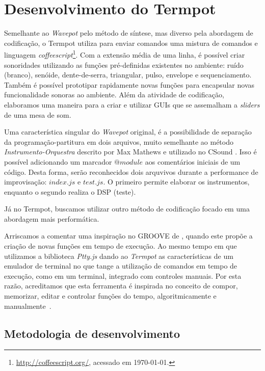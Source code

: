 \section{Desenvolvimento do Termpot}\label{sec:termpot}

Semelhante ao \emph{Wavepot} pelo método de síntese, mas diverso pela abordagem de codificação, o Termpot utiliza para enviar comandos uma mistura de comandos e linguagem \emph{coffeescript}\cite{burnham2011coffeescript}\footnote{\url{http://coffeescript.org/}, acessado em \today.}.
Com a extensão média de uma linha, é possível criar sonoridades utilizando as funções pré-definidas existentes no ambiente: ruído (branco), senóide, dente-de-serra, triangular, pulso, envelope e sequenciamento.
Também é possível prototipar rapidamente novas funções para encapsular novas funcionalidade sonoras ao ambiente.
Além da atividade de codificação, elaboramos uma maneira para a criar e utilizar GUIs que se assemalham a \emph{sliders} de uma mesa de som. 


Uma característica singular do \emph{Wavepot} original, é a possibilidade de separação da programação-partitura em dois arquivos, muito semelhante ao método \emph{Instrumento-Orquestra} descrito por Max Mathews e utilizado no CSound \cite{mathews_digital_1963, di_nunzio_genesi_2010}.
Isso é possível adicionando um marcador $@module$ aos comentários iniciais de um código.
Desta forma, serão reconhecidos dois arquvivos durante a performance de improvisação: $index.js$ e $test.js$.
O primeiro permite elaborar os instrumentos, enquanto o segundo realiza o DSP (teste).

Já no Termpot, buscamos utilizar outro método de codificação focado em uma abordagem mais performática.


Arriscamos a comentar uma inspiração no GROOVE de \cite{mathews_groove_1970,nunzio_groove_2010}, quando este propõe a criação de novas funções em tempo de execução. Ao mesmo tempo em que utilizamos a biblioteca \emph{Ptty.js} dando ao \emph{Termpot} as características de um emulador de terminal no que tange a utilização de comandos em tempo de execução, como em um terminal, integrado com controles manuais.
Por esta razão, acreditamos que esta ferramenta é inspirada no conceito de compor, memorizar, editar e controlar funções do tempo, algoritmicamente e manualmente~\cite{mathews_groove_1970}.


\subsection*{Metodologia de desenvolvimento}

